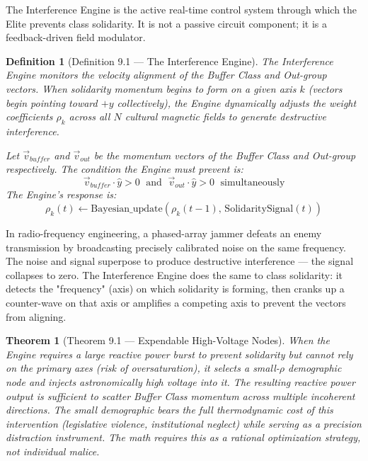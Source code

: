 \documentclass[12pt]{book}
\numberwithin{equation}{chapter}
\newtheorem{theorem}{Theorem}[chapter]
\newtheorem{definition}{Definition}[chapter]
\begin{document}
    The Interference Engine is the active real-time control system through which the Elite prevents class solidarity. It is not a passive circuit component; it is a feedback-driven field modulator.
  

\begin{definition}[Definition 9.1 — The Interference Engine]
The Interference Engine monitors the velocity alignment of the Buffer Class and Out-group vectors. When solidarity momentum begins to form on a given axis $k$ (vectors begin pointing toward $+y$ collectively), the Engine dynamically adjusts the weight coefficients $\rho_k$ across all $N$ cultural magnetic fields to generate destructive interference.
    \
\

    Let $\vec{v}_{buffer}$ and $\vec{v}_{out}$ be the momentum vectors of the Buffer Class and Out-group respectively. The condition the Engine must prevent is:
      \[ \vec{v}_{buffer} \cdot \hat{y} > 0 \;\text{ and }\; \vec{v}_{out} \cdot \hat{y} > 0 \;\text{ simultaneously} \]
    The Engine's response is:
    \[
      \rho_k(t) \leftarrow \text{Bayesian\_update}\left(\rho_k(t-1),\, \text{SolidaritySignal}(t)\right)
    \]
  \end{definition}

    In radio-frequency engineering, a phased-array jammer defeats an enemy transmission by broadcasting precisely calibrated noise on the same frequency. The noise and signal superpose to produce destructive interference — the signal collapses to zero. The Interference Engine does the same to class solidarity: it detects the "frequency" (axis) on which solidarity is forming, then cranks up a counter-wave on that axis or amplifies a competing axis to prevent the vectors from aligning.
  

\begin{theorem}[Theorem 9.1 — Expendable High-Voltage Nodes]
When the Engine requires a large reactive power burst to prevent solidarity but cannot rely on the primary axes (risk of oversaturation), it selects a small-$\rho$ demographic node and injects astronomically high voltage into it. The resulting reactive power output is sufficient to scatter Buffer Class momentum across multiple incoherent directions. The small demographic bears the full thermodynamic cost of this intervention (legislative violence, institutional neglect) while serving as a precision distraction instrument. The math requires this as a rational optimization strategy, not individual malice.
  \end{theorem}
\end{document}
